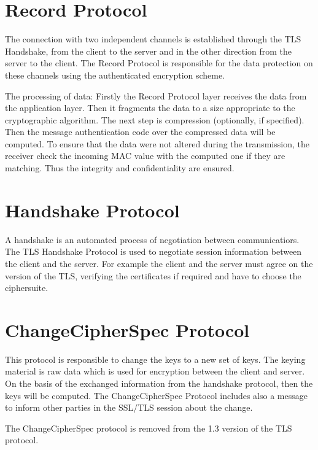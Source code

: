 \section{Record Protocol}
\label{sec:record_protocol}

The connection with two independent channels is established through the TLS Handshake, from the client to the server and in the other direction from the server to the client. The Record Protocol is responsible for the data protection on these channels using the authenticated encryption scheme.

The processing of data:              
Firstly the Record Protocol layer receives the data from the application layer. Then it fragments the data to a size appropriate to the cryptographic algorithm. 
The next step is compression (optionally, if specified). Then the message authentication code over the compressed data will be computed.
To ensure that the data were not altered during the transmission, the receiver check the incoming MAC value with the computed one if they are matching. Thus the integrity and confidentiality are ensured.
\cite{ms:Record}

\section{Handshake Protocol}
\label{sec:handshake_protocol}
 A handshake is an automated process of negotiation between communicatiors. The TLS Handshake Protocol is used to negotiate session information between the client and the server. For example the client and the server must agree on the version of the TLS, verifying the certificates if required and have to choose the ciphersuite. 

\cite{ms:overview}
\cite{ms:handshake}

\section{ChangeCipherSpec Protocol}
\label{sec:changeciphfer_protocol}
This protocol is responsible to change the keys to a new set of keys. 
The keying material is raw data which is used for encryption between the client and server. On the basis of the exchanged information from the handshake protocol, then the keys will be computed.
The ChangeCipherSpec Protocol includes also a message to inform other parties in the SSL/TLS session about the change.   \cite{ms:overview}

The ChangeCipherSpec protocol is removed from the 1.3 version of the TLS protocol.

